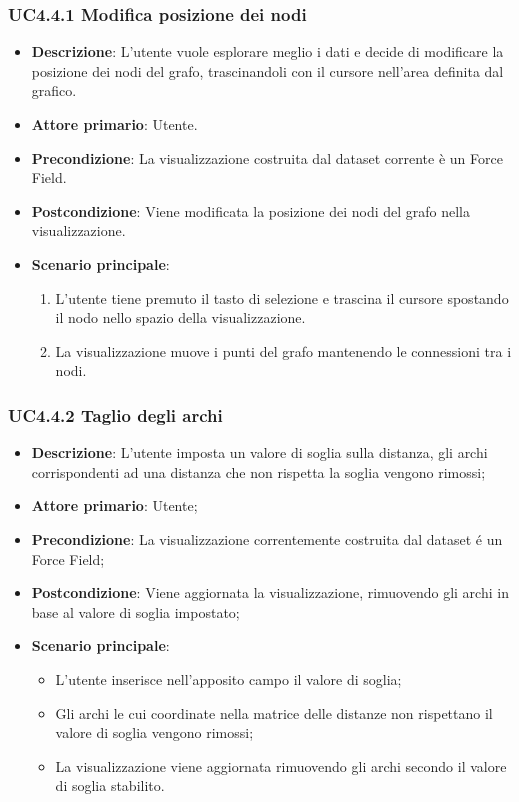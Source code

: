 \subsubsection{UC4.4.1 Modifica posizione dei nodi}
\label{ssub:uc4.4.1}
\begin{itemize}
    \item \textbf{Descrizione}: L’utente vuole esplorare meglio i dati e decide di 
                                modificare la posizione dei nodi del grafo, trascinandoli con il 
                                cursore nell'area definita dal grafico.
	
    \item \textbf{Attore primario}: Utente.
    
    \item \textbf{Precondizione}:   La visualizzazione costruita dal dataset corrente è un Force Field.
    \item \textbf{Postcondizione}:  Viene modificata la posizione dei nodi del grafo nella visualizzazione.

	\item \textbf{Scenario principale}:
        \begin{enumerate}
            \item L'utente tiene premuto il tasto di selezione e trascina il cursore spostando il nodo nello spazio della visualizzazione.
            \item La visualizzazione muove i punti del grafo mantenendo le connessioni tra i nodi.
        \end{enumerate}
\end{itemize}

\subsubsection{UC4.4.2 Taglio degli archi}
\label{ssub:uc4.4.2}
\begin{itemize}
    \item \textbf{Descrizione}:     L'utente imposta un valore di soglia sulla distanza, gli archi corrispondenti ad una distanza che non rispetta la soglia vengono rimossi;
    \item \textbf{Attore primario}: Utente;
    \item \textbf{Precondizione}:   La visualizzazione correntemente costruita dal dataset é un Force Field;
    \item \textbf{Postcondizione}:  Viene aggiornata la visualizzazione, rimuovendo gli archi in base al valore di soglia impostato;
    \item \textbf{Scenario principale}:
    \begin{itemize}
        \item L'utente inserisce nell'apposito campo il valore di soglia;
        \item Gli archi le cui coordinate nella matrice delle distanze non rispettano il valore di soglia vengono rimossi;
        \item La visualizzazione viene aggiornata rimuovendo gli archi secondo il valore di soglia stabilito.
    \end{itemize}
\end{itemize}

